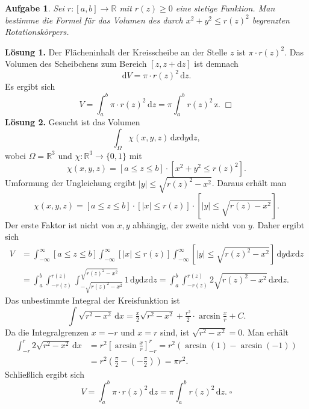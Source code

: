 \documentclass[a4paper,10pt,fleqn,twoside]{scrartcl}
\numberwithin{equation}{section}
\newcommand{\R}{\mathbb R}
\newcommand{\strong}[1]{{\normalfont\sffamily\bfseries #1}}
\renewcommand{\qedsymbol}{\ensuremath{\square}}
\theoremstyle{Aufgabe}
\newtheorem{Aufgabe}{\sffamily Aufgabe}[section]
\begin{document}
\begin{Aufgabe}
Sei $r\colon [a,b]\to\R$ mit $r(z)\ge 0$ eine stetige Funktion.
Man bestimme die Formel für das Volumen des durch $x^2+y^2\le r(z)^2$
begrenzten Rotationskörpers.
\end{Aufgabe}
\strong{Lösung 1.} Der Flächeninhalt der Kreisscheibe an der Stelle
$z$ ist $\pi\cdot r(z)^2$. Das Volumen des Scheibchens
zum Bereich $[z,z+\mathrm dz]$ ist demnach%
\begin{equation}
\mathrm dV = \pi\cdot r(z)^2\,\mathrm dz.
\end{equation}
Es ergibt sich
\begin{equation}
V = \int_a^b \pi\cdot r(z)^2\,\mathrm dz = \pi\int_a^b r(z)^2\,\mathrm z.\;\Box
\end{equation}
\strong{Lösung 2.} Gesucht ist das Volumen
\begin{equation}
\int_\Omega \chi(x,y,z)\,\mathrm dx\mathrm dy\mathrm dz,
\end{equation}
wobei $\Omega=\R^3$ und $\chi\colon\R^3\to\{0,1\}$ mit
\begin{equation}
\chi(x,y,z) = [a\le z\le b]\cdot [x^2+y^2\le r(z)^2].
\end{equation}
Umformung der Ungleichung ergibt $|y|\le\sqrt{r(z)^2-x^2}$.
Daraus erhält man%
\begin{equation}
\chi(x,y,z) = [a\le z\le b]\cdot [|x|\le r(z)]\cdot [|y|\le\sqrt{r(z)-x^2}].
\end{equation}
Der erste Faktor ist nicht von $x,y$ abhängig, der zweite nicht
von $y$. Daher ergibt sich%
\begin{align}
V &= \int_{-\infty}^\infty [a\le z\le b]
  \int_{-\infty}^\infty [|x|\le r(z)]
  \int_{-\infty}^\infty [|y|\le\sqrt{r(z)^2-x^2}]\,\mathrm dy\mathrm dx\mathrm dz\\
&= \int_a^b \int_{-r(z)}^{r(z)}
  \int_{-\sqrt{r(z)^2-x^2}}^{\sqrt{r(z)^2-x^2}}
  1\,\mathrm dy\mathrm dx\mathrm dz
= \int_a^b \int_{-r(z)}^{r(z)} 2\sqrt{r(z)^2-x^2}\,\mathrm dx\mathrm dz.
\end{align}
Das unbestimmte Integral der Kreisfunktion ist
\begin{equation}
\int \sqrt{r^2-x^2}\,\mathrm dx
= \tfrac{x}{2}\sqrt{r^2-x^2}+\tfrac{r^2}{2}\cdot\arcsin\tfrac{x}{r}+C.
\end{equation}
Da die Integralgrenzen $x=-r$ und $x=r$ sind, ist $\sqrt{r^2-x^2}=0$.
Man erhält%
\begin{align}
\int_{-r}^r 2\sqrt{r^2-x^2}\,\mathrm dx
&= r^2[\arcsin\tfrac{x}{r}]_{-r}^r
= r^2(\arcsin(1)-\arcsin(-1))\\
&= r^2(\tfrac{\pi}{2}-(-\tfrac{\pi}{2}))
= \pi r^2.
\end{align}
Schließlich ergibt sich
\begin{equation}
V = \int_a^b \pi\cdot r(z)^2\,\mathrm dz
= \pi\int_a^b r(z)^2\,\mathrm dz.\;\qedsymbol
\end{equation}
\end{document}
